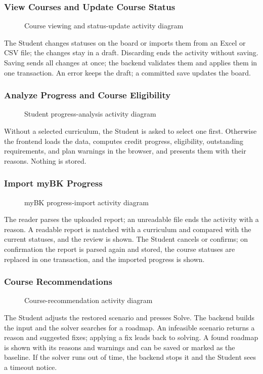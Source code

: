 \subsubsection{View Courses and Update Course Status}
\begin{figure}[H]
    \centering
    
    \caption{Course viewing and status-update activity diagram}
\end{figure}
The Student changes statuses on the board or imports them from an Excel or CSV file; the changes stay in a draft. Discarding ends the activity without saving. Saving sends all changes at once; the backend validates them and applies them in one transaction. An error keeps the draft; a committed save updates the board.

\subsubsection{Analyze Progress and Course Eligibility}
\begin{figure}[H]
    \centering
    
    \caption{Student progress-analysis activity diagram}
\end{figure}
Without a selected curriculum, the Student is asked to select one first. Otherwise the frontend loads the data, computes credit progress, eligibility, outstanding requirements, and plan warnings in the browser, and presents them with their reasons. Nothing is stored.

\subsubsection{Import myBK Progress}
\begin{figure}[H]
    \centering
    
    \caption{myBK progress-import activity diagram}
\end{figure}
The reader parses the uploaded report; an unreadable file ends the activity with a reason. A readable report is matched with a curriculum and compared with the current statuses, and the review is shown. The Student cancels or confirms; on confirmation the report is parsed again and stored, the course statuses are replaced in one transaction, and the imported progress is shown.

\subsubsection{Course Recommendations}
\begin{figure}[H]
    \centering
    
    \caption{Course-recommendation activity diagram}
\end{figure}
The Student adjusts the restored scenario and presses Solve. The backend builds the input and the solver searches for a roadmap. An infeasible scenario returns a reason and suggested fixes; applying a fix leads back to solving. A found roadmap is shown with its reasons and warnings and can be saved or marked as the baseline. If the solver runs out of time, the backend stops it and the Student sees a timeout notice.

